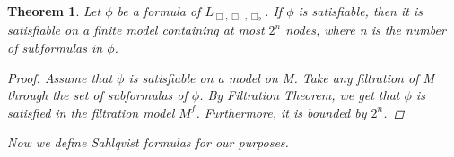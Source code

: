 \documentclass[12pt, a4paper]{scrartcl}
\newtheorem{theorem}[definition]{Theorem}
\begin{document}
\begin{theorem}
    Let $\phi$ be a formula of $L_{\Box,\Box_1,\Box_2}$. If $\phi$ is satisfiable, then it is satisfiable on a finite model containing at most $2^n$ nodes, where n is the number of subformulas in $\phi$.

    \begin{proof}
    Assume that $\phi$ is satisfiable on a model on M. Take any filtration of M through the set of subformulas of $\phi$. 
    By Filtration Theorem, we get that $\phi$ is satisfied in the filtration model $M^f$. Furthermore, it is bounded by $2^n$.
    
    \end{proof}
    
    Now we define Sahlqvist formulas for our purposes.
        
\end{theorem}
\end{document}
